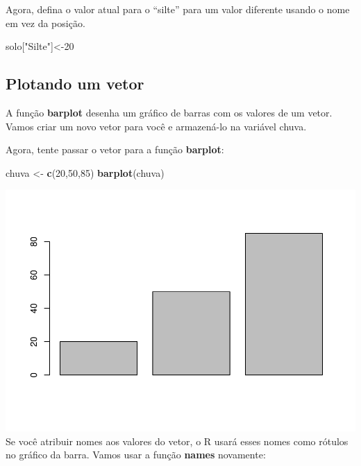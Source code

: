 \documentclass[]{book}
\newenvironment{Shaded}{\begin{snugshade}}{\end{snugshade}}
\newcommand{\DecValTok}[1]{\textcolor[rgb]{0.00,0.00,0.81}{#1}}
\newcommand{\KeywordTok}[1]{\textcolor[rgb]{0.13,0.29,0.53}{\textbf{#1}}}
\newcommand{\NormalTok}[1]{#1}
\newcommand{\StringTok}[1]{\textcolor[rgb]{0.31,0.60,0.02}{#1}}
\begin{document}
Agora, defina o valor atual para o ``silte'' para um valor diferente usando o nome em vez da posição.

\begin{Shaded}
\begin{Highlighting}[]
\NormalTok{solo[}\StringTok{"Silte"}\NormalTok{]<-}\DecValTok{20}
\end{Highlighting}
\end{Shaded}

\hypertarget{plotando-um-vetor}{%
\subsection{Plotando um vetor}\label{plotando-um-vetor}}

A função \textbf{barplot} desenha um gráfico de barras com os valores de um vetor. Vamos criar um novo vetor para você e armazená-lo na variável chuva.

Agora, tente passar o vetor para a função \textbf{barplot}:

\begin{Shaded}
\begin{Highlighting}[]
\NormalTok{chuva <-}\StringTok{ }\KeywordTok{c}\NormalTok{(}\DecValTok{20}\NormalTok{,}\DecValTok{50}\NormalTok{,}\DecValTok{85}\NormalTok{)}
\KeywordTok{barplot}\NormalTok{(chuva)}
\end{Highlighting}
\end{Shaded}

\includegraphics{TudodoR_files/figure-latex/unnamed-chunk-32-1.pdf}
Se você atribuir nomes aos valores do vetor, o R usará esses nomes como rótulos no gráfico da barra. Vamos usar a função \textbf{names} novamente:
\end{document}
